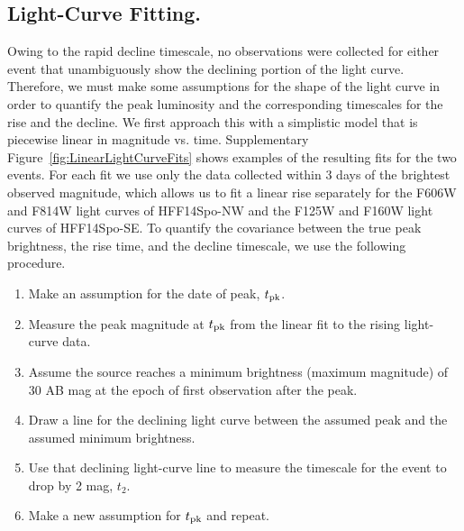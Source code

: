 \documentclass{article}
\def\spockone{HFF14Spo-NW\xspace}
\def\spocktwo{HFF14Spo-SE\xspace}
\begin{document}
\subsection{Light-Curve Fitting.}\label{sec:LightCurves}



Owing to the rapid decline timescale, no observations were collected for
either event that unambiguously show the declining portion of the
light curve. Therefore, we must make some assumptions for the shape of
the light curve in order to quantify the peak luminosity and the
corresponding timescales for the rise and the decline.  We first
approach this with a simplistic model that is piecewise linear in
magnitude vs. time. Supplementary Figure~\ref{fig:LinearLightCurveFits} shows
examples of the resulting fits for the two events.  For each fit we
use only the data collected within 3 days of the brightest observed
magnitude, which allows us to fit a linear rise separately for the
F606W and F814W light curves of \spockone and the F125W and F160W
light curves of \spocktwo. To quantify the covariance between the
true peak brightness, the rise time, and the decline timescale, we use
the following procedure.

\begin{enumerate}
\item Make an assumption for the date of peak, $t_{\rm pk}$.
\item Measure the peak magnitude at $t_{\rm pk}$ from the linear fit
  to the rising light-curve data.
\item Assume the source reaches a minimum brightness (maximum
  magnitude) of 30 AB mag at the epoch of first observation after the
  peak.
\item Draw a line for the declining light curve between the assumed
  peak and the assumed minimum brightness.
\item Use that declining light-curve line to measure the timescale for
  the event to drop by 2 mag, $t_2$.
\item Make a new assumption for $t_{\rm pk}$ and repeat.
\end{enumerate}


\end{document}
